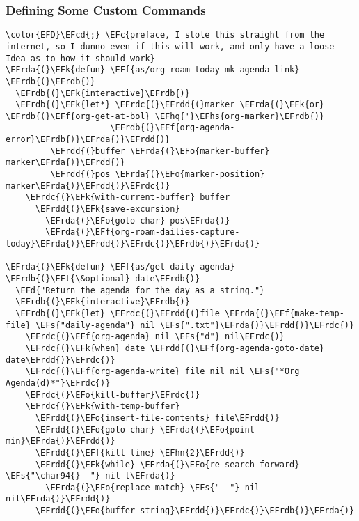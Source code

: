 \documentclass{article}
\newcommand{\EFc}[1]{\textcolor{EFc}{#1}} %
\newcommand{\EFcd}[1]{\textcolor{EFcd}{#1}} %
\newcommand{\EFs}[1]{\textcolor{EFs}{#1}} %
\newcommand{\EFd}[1]{\textcolor{EFd}{#1}} %
\newcommand{\EFk}[1]{\textcolor{EFk}{#1}} %
\newcommand{\EFf}[1]{\textcolor{EFf}{#1}} %
\newcommand{\EFt}[1]{\textcolor{EFt}{#1}} %
\newcommand{\EFo}[1]{\textcolor{EFo}{#1}} %
\newcommand{\EFhn}[1]{\textcolor{EFhn}{\textbf{#1}}} %
\newcommand{\EFhq}[1]{#1} %
\newcommand{\EFhs}[1]{\textcolor{EFhs}{#1}} %
\newcommand{\EFrda}[1]{\textcolor{EFrda}{#1}} %
\newcommand{\EFrdb}[1]{\textcolor{EFrdb}{#1}} %
\newcommand{\EFrdc}[1]{\textcolor{EFrdc}{#1}} %
\newcommand{\EFrdd}[1]{\textcolor{EFrdd}{#1}} %
\begin{document}
\subsubsection{Defining Some Custom Commands}
\label{sec:org6c7a568}
\begin{Code}
\begin{Verbatim}
\color{EFD}\EFcd{;} \EFc{preface, I stole this straight from the internet, so I dunno even if this will work, and only have a loose Idea as to how it should work}
\EFrda{(}\EFk{defun} \EFf{as/org-roam-today-mk-agenda-link} \EFrdb{(}\EFrdb{)}
  \EFrdb{(}\EFk{interactive}\EFrdb{)}
  \EFrdb{(}\EFk{let*} \EFrdc{(}\EFrdd{(}marker \EFrda{(}\EFk{or} \EFrdb{(}\EFf{org-get-at-bol} \EFhq{'}\EFhs{org-marker}\EFrdb{)}
                     \EFrdb{(}\EFf{org-agenda-error}\EFrdb{)}\EFrda{)}\EFrdd{)}
         \EFrdd{(}buffer \EFrda{(}\EFo{marker-buffer} marker\EFrda{)}\EFrdd{)}
         \EFrdd{(}pos \EFrda{(}\EFo{marker-position} marker\EFrda{)}\EFrdd{)}\EFrdc{)}
    \EFrdc{(}\EFk{with-current-buffer} buffer
      \EFrdd{(}\EFk{save-excursion}
        \EFrda{(}\EFo{goto-char} pos\EFrda{)}
        \EFrda{(}\EFf{org-roam-dailies-capture-today}\EFrda{)}\EFrdd{)}\EFrdc{)}\EFrdb{)}\EFrda{)}

\EFrda{(}\EFk{defun} \EFf{as/get-daily-agenda} \EFrdb{(}\EFt{\&optional} date\EFrdb{)}
  \EFd{"Return the agenda for the day as a string."}
  \EFrdb{(}\EFk{interactive}\EFrdb{)}
  \EFrdb{(}\EFk{let} \EFrdc{(}\EFrdd{(}file \EFrda{(}\EFf{make-temp-file} \EFs{"daily-agenda"} nil \EFs{".txt"}\EFrda{)}\EFrdd{)}\EFrdc{)}
    \EFrdc{(}\EFf{org-agenda} nil \EFs{"d"} nil\EFrdc{)}
    \EFrdc{(}\EFk{when} date \EFrdd{(}\EFf{org-agenda-goto-date} date\EFrdd{)}\EFrdc{)}
    \EFrdc{(}\EFf{org-agenda-write} file nil nil \EFs{"*Org Agenda(d)*"}\EFrdc{)}
    \EFrdc{(}\EFo{kill-buffer}\EFrdc{)}
    \EFrdc{(}\EFk{with-temp-buffer}
      \EFrdd{(}\EFo{insert-file-contents} file\EFrdd{)}
      \EFrdd{(}\EFo{goto-char} \EFrda{(}\EFo{point-min}\EFrda{)}\EFrdd{)}
      \EFrdd{(}\EFf{kill-line} \EFhn{2}\EFrdd{)}
      \EFrdd{(}\EFk{while} \EFrda{(}\EFo{re-search-forward} \EFs{"\char94{}  "} nil t\EFrda{)}
        \EFrda{(}\EFo{replace-match} \EFs{"- "} nil nil\EFrda{)}\EFrdd{)}
      \EFrdd{(}\EFo{buffer-string}\EFrdd{)}\EFrdc{)}\EFrdb{)}\EFrda{)}
\end{Verbatim}
\end{Code}
\end{document}
